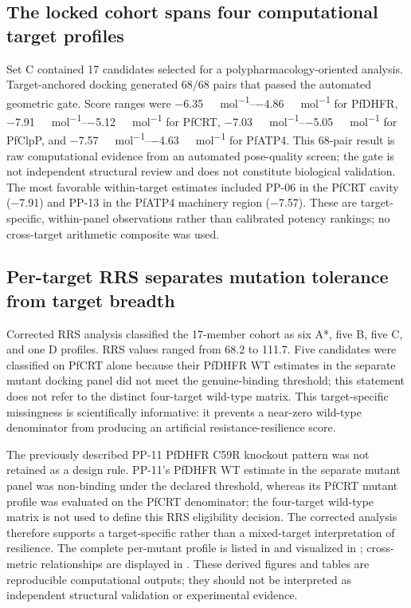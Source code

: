 \documentclass[journal=jcisd8,manuscript=article]{achemso}
\begin{document}
\subsection{The locked cohort spans four computational target profiles}
Set C contained 17 candidates selected for a polypharmacology-oriented analysis. Target-anchored docking generated \num{68}/\num{68} pairs that passed the automated geometric gate. Score ranges were \qtyrange{-6.35}{-4.86}{\kilo\calorie\per\mole} for PfDHFR, \qtyrange{-7.91}{-5.12}{\kilo\calorie\per\mole} for PfCRT, \qtyrange{-7.03}{-5.05}{\kilo\calorie\per\mole} for PfClpP, and \qtyrange{-7.57}{-4.63}{\kilo\calorie\per\mole} for PfATP4. This 68-pair result is raw computational evidence from an automated pose-quality screen; the gate is not independent structural review and does not constitute biological validation. The most favorable within-target estimates included PP-06 in the PfCRT cavity (\num{-7.91}) and PP-13 in the PfATP4 machinery region (\num{-7.57}). These are target-specific, within-panel observations rather than calibrated potency rankings; no cross-target arithmetic composite was used.

\subsection{Per-target RRS separates mutation tolerance from target breadth}
Corrected RRS analysis classified the 17-member cohort as six A*, five B, five C, and one D profiles. RRS values ranged from \num{68.2} to \num{111.7}. Five candidates were classified on PfCRT alone because their PfDHFR WT estimates in the separate mutant docking panel did not meet the genuine-binding threshold; this statement does not refer to the distinct four-target wild-type matrix. This target-specific missingness is scientifically informative: it prevents a near-zero wild-type denominator from producing an artificial resistance-resilience score.

The previously described PP-11 PfDHFR C59R knockout pattern was not retained as a design rule. PP-11's PfDHFR WT estimate in the separate mutant panel was non-binding under the declared threshold, whereas its PfCRT mutant profile was evaluated on the PfCRT denominator; the four-target wild-type matrix is not used to define this RRS eligibility decision. The corrected analysis therefore supports a target-specific rather than a mixed-target interpretation of resilience. The complete per-mutant profile is listed in  and visualized in ; cross-metric relationships are displayed in . These derived figures and tables are reproducible computational outputs; they should not be interpreted as independent structural validation or experimental evidence.
\end{document}
